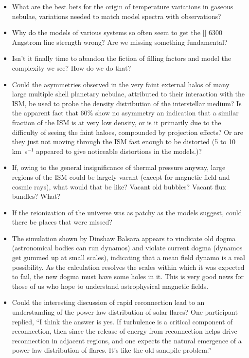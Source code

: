 \documentclass[proceedings]{rmaa}
\begin{document}
\begin{itemize}
\item  What are the best bets for the origin of temperature variations in 
gaseous nebulae, variations needed to match model spectra with observations?

\item  Why do the models of various systems so often seem to get the [\protect{}]  
6300 Angstrom line strength wrong?  Are we missing something fundamental?

\item  Isn't it finally time to abandon the fiction of filling factors and  
model the complexity we see?  How do we do that?

\item  Could the asymmetries observed in the very faint external halos of 
many large multiple shell planetary nebulae, attributed to their 
interaction with the ISM, be used to probe the density distribution of 
the interstellar medium?  Is the apparent fact that 60\% show no asymmetry 
an indication that a similar fraction of the ISM is at very low density,  
or is it primarily due to the difficulty of seeing the faint haloes, 
compounded by projection effects?  Or are they just not moving through 
the ISM fast enough to be distorted (5 to 10 km~s$^{-1}$ appeared to give 
noticeable distortions in the models.)?  

\item  If, owing to the general insignificance of thermal pressure anyway,  
large regions of the ISM could be largely vacant (except for magnetic 
field and cosmic rays), what would that be like?  Vacant old bubbles?  
Vacant flux bundles?  What?

\item  If the reionization of the universe was as patchy as the models 
suggest, could there be places that were missed?

\item  The simulation shown by Dinshaw Balsara appears to vindicate old dogma 
(astronomical bodies can run dynamos) and violate current dogma (dynamos  
get gummed up at small scales), indicating that a mean field dynamo is a  
real possibility.  As the calculation resolves the scales within which it 
was expected to fail, the new dogma must have some holes in it.  This is  
very good news for those of us who hope to understand astrophysical 
magnetic fields.

\item  Could the interesting discussion of rapid reconnection lead to an 
understanding of the power law distribution of solar flares?  One 
participant replied, ``I think the answer is yes.  If turbulence is a 
critical component of reconnection, then since the release of energy from 
reconnection helps  drive reconnection in adjacent regions, and one 
expects the natural emergence of a power law distribution of flares.  
It's like the old sandpile problem.''


\end{itemize}
\end{document}
